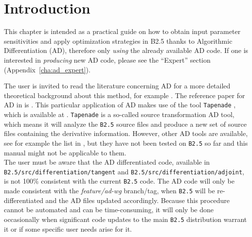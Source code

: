 
\section{Introduction}

This chapter is intended as a practical guide on how to obtain input parameter sensitivities and apply optimization strategies in B2.5 thanks to Algorithmic Differentiation (AD), therefore only {\em using} the already available AD code. If one is interested in {\em producing} new AD code, please see the ``Expert'' section (Appendix~\ref{cha:ad_expert}).

The user is invited to read the literature concerning AD for a more detailed theoretical background about this method, for example \cite{griewank}. The reference paper for AD in \SOLPSITER is \cite{carlijcp}. This particular application of AD makes use of the tool {\tt Tapenade} \cite{tapenade}, which is available at \cite{tapesite}. {\tt Tapenade} is a so-called source transformation AD tool, which means it will analyze the {\tt B2.5} source files and produce a new set of source files containing the derivative information. However, other AD tools are available, see for example the list in \cite{autodiff}, but they have not been tested on {\tt B2.5} so far and this manual might not be applicable to them.\\

The user must be aware that the AD differentiated code, available in {\tt B2.5/src/differentiation/tangent} and {\tt B2.5/src/differentiation/adjoint}, is not 100\% consistent with the current {\tt B2.5} code. The AD code will only be made consistent with the {\it feature/ad-wg} branch/tag, when {\tt B2.5} will be re-differentiated and the AD files updated accordingly. Because this procedure cannot be automated and can be time-consuming, it will only be done occasionally when significant code updates to the main {\tt B2.5} distribution warrant it or if some specific user needs arise for it.

